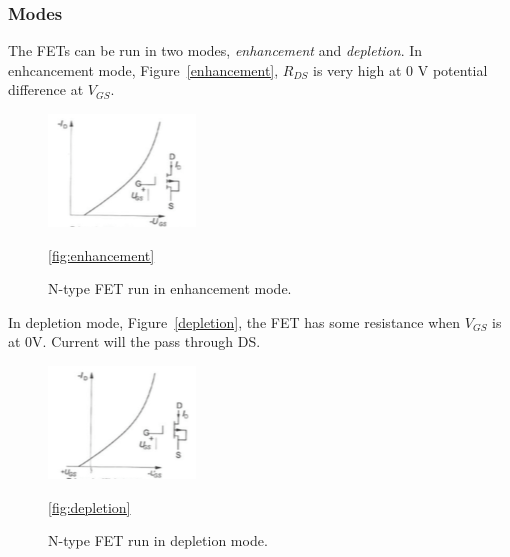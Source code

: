 \subsubsection*{Modes}
The FETs can be run in two modes, \textit{enhancement} and \textit{depletion}.
In enhcancement mode, Figure~\ref{enhancement}, $R_{DS}$ is very high at 0 V 
potential difference at $V_{GS}$. 
\begin{figure}[H]
    \centering
    \includegraphics{./figures/enhancement.png}
    \caption{N-type FET run in enhancement mode.}
    \ref{fig:enhancement}
\end{figure}
In depletion mode, Figure~\ref{depletion}, the FET has some resistance when $V_{GS}$ 
is at 0V. Current will the pass through DS.
\begin{figure}[H]
    \centering
    \includegraphics{./figures/depletion.png}
    \caption{N-type FET run in depletion mode.}
    \ref{fig:depletion}
\end{figure}

